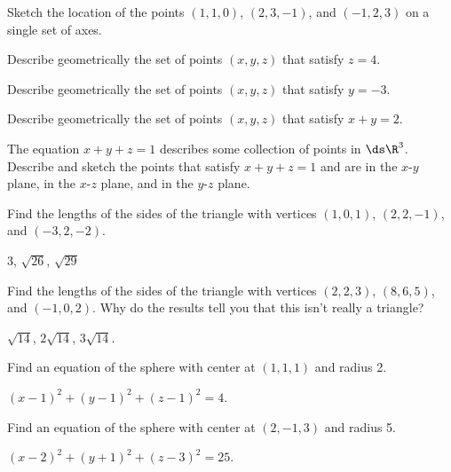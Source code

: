 \begin{enumialphparenastyle}

\begin{ex}
Sketch the location of the points $(1,1,0)$, $(2,3,-1)$,
and $(-1,2,3)$ on a single set of axes.
\end{ex}

\begin{ex}
Describe geometrically the set of points $(x,y,z)$ that
satisfy $z=4$.
\end{ex}

\begin{ex}
Describe geometrically the set of points $(x,y,z)$ that
satisfy $y=-3$.
\end{ex}

\begin{ex}
Describe geometrically the set of points $(x,y,z)$ that
satisfy $x+y=2$.
\end{ex}

\begin{ex}
The equation $x+y+z=1$ describes some collection of points
in $\ds \R^3$. Describe and sketch the points that satisfy $x+y+z=1$ and
are in the $x$-$y$ plane, in the $x$-$z$ plane, and in the 
$y$-$z$ plane.
\end{ex}

\begin{ex}
Find the lengths of the sides of the triangle with 
vertices $(1,0,1)$, $(2,2,-1)$, and $(-3,2,-2)$.
\begin{sol}
$3$, $\sqrt{26}$, $\sqrt{29}$
\end{sol}
\end{ex}

\begin{ex}
Find the lengths of the sides of the triangle with 
vertices $(2,2,3)$, $(8,6,5)$, and $(-1,0,2)$. Why do the results tell
you that this isn't really a triangle?
\begin{sol}
$\sqrt{14}$, $2\sqrt{14}$, $3\sqrt{14}$.
\end{sol}
\end{ex}

\begin{ex}
Find an equation of the sphere with center at $(1,1,1)$ and
radius 2.
\begin{sol}
$(x-1)^2+(y-1)^2+(z-1)^2=4$.
\end{sol}
\end{ex}

\begin{ex}
Find an equation of the sphere with center at $(2,-1,3)$ and
radius 5.
\begin{sol}
$(x-2)^2+(y+1)^2+(z-3)^2=25$.
\end{sol}
\end{ex}


\end{enumialphparenastyle}
